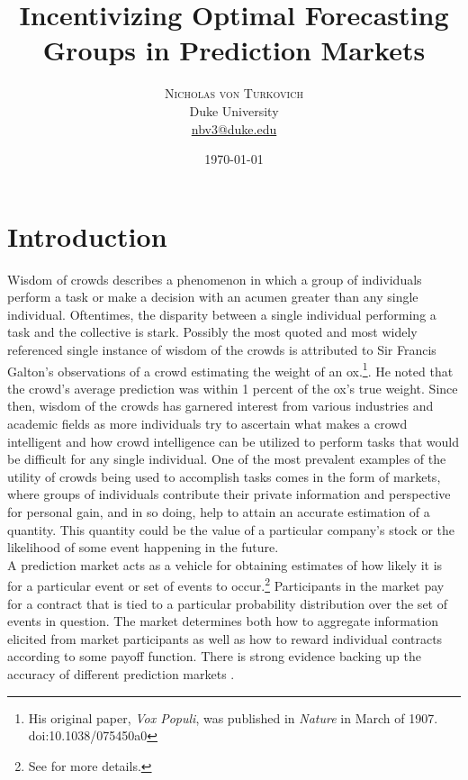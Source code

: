 \documentclass[twoside,twocolumn]{article}
\title{Incentivizing Optimal Forecasting Groups in Prediction Markets} %
\author{%
\textsc{Nicholas von Turkovich} \\%
\normalsize Duke University \\ %
\normalsize \href{mailto:nbv3@duke.edu}{nbv3@duke.edu} %
}
\date{\today} %
\begin{document}
\maketitle


\section{Introduction}

Wisdom of crowds describes a phenomenon in which a group of individuals perform a task or make a decision with an acumen greater than any single individual. Oftentimes, the disparity between a single individual performing a task and the collective is stark. Possibly the most quoted and most widely referenced single instance of wisdom of the crowds is attributed to Sir Francis Galton's observations of a crowd estimating the weight of an ox.\footnote{His original paper, \textit{Vox Populi}, was published in \textit{Nature} in March of 1907. doi:10.1038/075450a0}. He noted that the crowd's average prediction was within 1 percent of the ox's true weight. Since then, wisdom of the crowds has garnered interest from various industries and academic fields as more individuals try to ascertain what makes a crowd intelligent and how crowd intelligence can be utilized to perform tasks that would be difficult for any single individual. One of the most prevalent examples of the utility of crowds being used to accomplish tasks comes in the form of markets, where groups of individuals contribute their private information and perspective for personal gain, and in so doing, help to attain an accurate estimation of a quantity. This quantity could be the value of a particular company's stock or the likelihood of some event happening in the future.\\
\newline
A prediction market acts as a vehicle for obtaining estimates of how likely it is for a particular event or set of events to occur.\footnote{See \cite{1} for more details.} Participants in the market pay for a contract that is tied to a particular probability distribution over the set of events in question. The market determines both how to aggregate information elicited from market participants as well as how to reward individual contracts according to some payoff function. There is strong evidence backing up the accuracy of different prediction markets \cite{2}.\\
\end{document}
